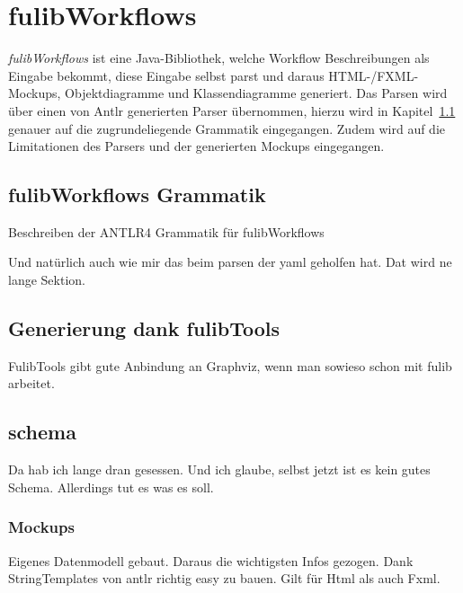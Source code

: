 \section{fulibWorkflows}\label{sec:fulibworkflows2}
\textit{fulibWorkflows} ist eine Java-Bibliothek, welche Workflow Beschreibungen als Eingabe bekommt, diese Eingabe
selbst parst und daraus HTML-/FXML-Mockups, Objektdiagramme und Klassendiagramme generiert.
Das Parsen wird über einen von Antlr generierten Parser übernommen, hierzu wird in Kapitel~\ref{subsec:fulibworkflows-grammatik} genauer auf
die zugrundeliegende Grammatik eingegangen.
Zudem wird auf die Limitationen des Parsers und der generierten Mockups eingegangen.

\subsection{fulibWorkflows Grammatik}\label{subsec:fulibworkflows-grammatik}
Beschreiben der ANTLR4 Grammatik für fulibWorkflows

Und natürlich auch wie mir das beim parsen der yaml geholfen hat.
Dat wird ne lange Sektion.

\subsection{Generierung dank fulibTools}\label{subsec:generierung-dank-fulibtools}
FulibTools gibt gute Anbindung an Graphviz, wenn man sowieso schon mit fulib arbeitet.

\subsection{schema}\label{subsec:schema}
Da hab ich lange dran gesessen.
Und ich glaube, selbst jetzt ist es kein gutes Schema.
Allerdings tut es was es soll.

\subsubsection{Mockups}
Eigenes Datenmodell gebaut.
Daraus die wichtigsten Infos gezogen.
Dank StringTemplates von antlr richtig easy zu bauen.
Gilt für Html als auch Fxml.
